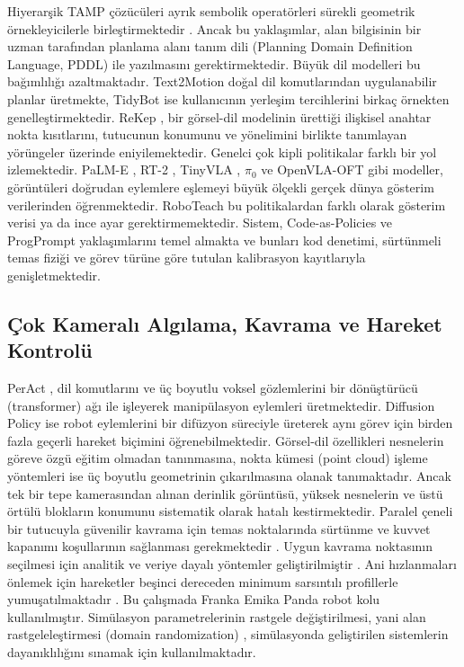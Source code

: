 \documentclass[preprint,12pt]{elsarticle}
\begin{document}
Hiyerarşik TAMP çözücüleri ayrık sembolik operatörleri sürekli geometrik örnekleyicilerle birleştirmektedir \cite{kaelbling2011hpn,garrett2020pddlstream}. Ancak bu yaklaşımlar, alan bilgisinin bir uzman tarafından planlama alanı tanım dili (Planning Domain Definition Language, PDDL) ile yazılmasını gerektirmektedir. Büyük dil modelleri bu bağımlılığı azaltmaktadır. Text2Motion \cite{lin2023text2motion} doğal dil komutlarından uygulanabilir planlar üretmekte, TidyBot \cite{wu2023tidybot} ise kullanıcının yerleşim tercihlerini birkaç örnekten genelleştirmektedir. ReKep \cite{huang2024rekep}, bir görsel-dil modelinin ürettiği ilişkisel anahtar nokta kısıtlarını, tutucunun konumunu ve yönelimini birlikte tanımlayan yörüngeler üzerinde eniyilemektedir. Genelci çok kipli politikalar farklı bir yol izlemektedir. PaLM-E \cite{driess2023palme}, RT-2 \cite{zitkovich2023rt2}, TinyVLA \cite{wen2025tinyvla}, \(\pi_0\) \cite{black2025pi0} ve OpenVLA-OFT \cite{kim2025openvlaoft} gibi modeller, görüntüleri doğrudan eylemlere eşlemeyi büyük ölçekli gerçek dünya gösterim verilerinden öğrenmektedir. RoboTeach bu politikalardan farklı olarak gösterim verisi ya da ince ayar gerektirmemektedir. Sistem, Code-as-Policies \cite{liang2023cap} ve ProgPrompt \cite{singh2023progprompt} yaklaşımlarını temel almakta ve bunları kod denetimi, sürtünmeli temas fiziği ve görev türüne göre tutulan kalibrasyon kayıtlarıyla genişletmektedir.

\hypertarget{uxe7ok-kameralux131-algux131lama-kavrama-ve-hareket-kontroluxfc}{%
\subsection{Çok Kameralı Algılama, Kavrama ve Hareket Kontrolü}\label{uxe7ok-kameralux131-algux131lama-kavrama-ve-hareket-kontroluxfc}}

PerAct \cite{shridhar2023peract}, dil komutlarını ve üç boyutlu voksel gözlemlerini bir dönüştürücü (transformer) ağı ile işleyerek manipülasyon eylemleri üretmektedir. Diffusion Policy \cite{chi2024diffusion} ise robot eylemlerini bir difüzyon süreciyle üreterek aynı görev için birden fazla geçerli hareket biçimini öğrenebilmektedir. Görsel-dil özellikleri \cite{radford2021clip} nesnelerin göreve özgü eğitim olmadan tanınmasına, nokta kümesi (point cloud) işleme yöntemleri \cite{rusu2011pcl} ise üç boyutlu geometrinin çıkarılmasına olanak tanımaktadır. Ancak tek bir tepe kamerasından alınan derinlik görüntüsü, yüksek nesnelerin ve üstü örtülü blokların konumunu sistematik olarak hatalı kestirmektedir. Paralel çeneli bir tutucuyla güvenilir kavrama için temas noktalarında sürtünme ve kuvvet kapanımı koşullarının sağlanması gerekmektedir \cite{bicchi2000grasping}. Uygun kavrama noktasının seçilmesi için analitik ve veriye dayalı yöntemler geliştirilmiştir \cite{bohg2014grasp}. Ani hızlanmaları önlemek için hareketler beşinci dereceden minimum sarsıntılı profillerle yumuşatılmaktadır \cite{flash1985coordination}. Bu çalışmada Franka Emika Panda robot kolu \cite{haddadin2022franka} kullanılmıştır. Simülasyon parametrelerinin rastgele değiştirilmesi, yani alan rastgeleleştirmesi (domain randomization) \cite{tobin2017domain}, simülasyonda geliştirilen sistemlerin dayanıklılığını sınamak için kullanılmaktadır.
\end{document}
